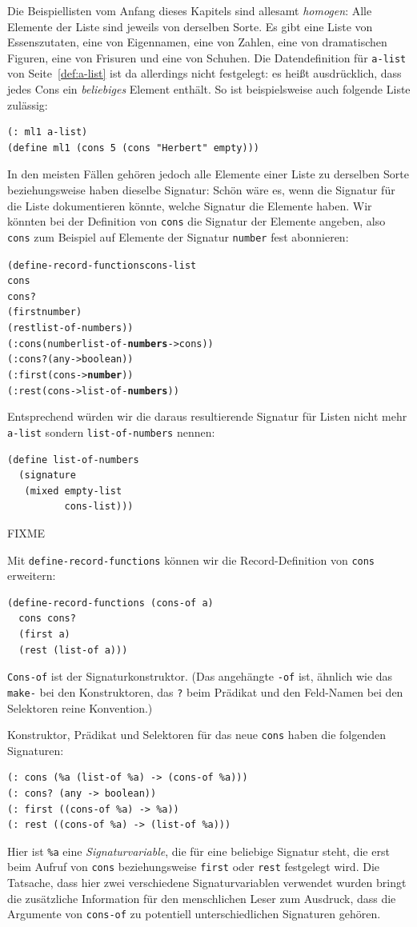 Die Beispiellisten vom Anfang dieses Kapitels sind allesamt
\textit{homogen}: Alle Elemente der Liste sind jeweils
von derselben Sorte.  Es gibt eine Liste von Essenszutaten, eine von
Eigennamen, eine von Zahlen, eine von dramatischen Figuren, eine von
Frisuren und eine von Schuhen.  Die Datendefinition für
\texttt{a-list} von Seite~\ref{def:a-list} ist da allerdings nicht
festgelegt: es heißt ausdrücklich, dass jedes Cons ein
\emph{beliebiges} Element enthält.  So ist beispielsweise auch
folgende Liste zulässig:
%
\begin{verbatim}
(: ml1 a-list)
(define ml1 (cons 5 (cons "Herbert" empty)))
\end{verbatim}
%
In den meisten Fällen gehören jedoch alle Elemente einer Liste zu
derselben Sorte beziehungsweise haben dieselbe Signatur: Schön wäre
es, wenn die Signatur für die Liste dokumentieren könnte, welche
Signatur die Elemente haben.  Wir könnten bei
der Definition von \texttt{cons} die Signatur der Elemente angeben,
also \texttt{cons} zum Beispiel auf Elemente der Signatur
\texttt{number} fest abonnieren: 
%
\begin{alltt}
(define-record-functions cons-list
  cons
  cons?
  (first number)
  (rest  list-of-numbers))
(: cons (number list-of-\textbf{numbers} -> cons))
(: cons? (any -> boolean))
(: first (cons -> \textbf{number}))
(: rest (cons -> list-of-\textbf{numbers}))
\end{alltt}
%
Entsprechend würden wir die daraus resultierende Signatur für Listen
nicht mehr \texttt{a-list} sondern \texttt{list-of-numbers} nennen:
%
\begin{verbatim}
(define list-of-numbers
  (signature
   (mixed empty-list
          cons-list)))
\end{verbatim}
%

FIXME

Mit
\texttt{define-record-functions} können wir die
Record-Definition von \texttt{cons} erweitern:
%
\begin{verbatim}
(define-record-functions (cons-of a)
  cons cons?
  (first a)
  (rest (list-of a)))
\end{verbatim}
%
\texttt{Cons-of} ist der Signaturkonstruktor.  (Das angehängte
\texttt{-of} ist, ähnlich wie das \texttt{make-} bei den
Konstruktoren, das \texttt{?} beim Prädikat und den Feld-Namen bei den
Selektoren reine Konvention.)

Konstruktor, Prädikat
und Selektoren für das neue \texttt{cons} haben die folgenden
Signaturen:
%
\begin{verbatim}
(: cons (%a (list-of %a) -> (cons-of %a)))
(: cons? (any -> boolean))
(: first ((cons-of %a) -> %a))
(: rest ((cons-of %a) -> (list-of %a)))
\end{verbatim}
%
Hier ist  \verb|%a| eine
\textit{Signaturvariable}, die für eine beliebige
Signatur steht, die erst beim Aufruf von \texttt{cons} beziehungsweise
\texttt{first} oder \texttt{rest} festgelegt wird.
Die Tatsache, dass hier zwei verschiedene Signaturvariablen
verwendet wurden bringt die zusätzliche Information für den
menschlichen Leser zum Ausdruck, dass die
Argumente von \texttt{cons-of} zu potentiell
unterschiedlichen Signaturen gehören.

